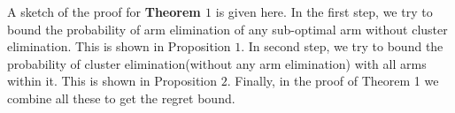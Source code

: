 \begin{remark}
\label{Result:Rem:8}
A sketch of the proof for \textbf{Theorem $1$} is given here. In the first step, we try to bound the probability of arm elimination of any sub-optimal arm without cluster elimination. This is shown in Proposition $1$. In second step, we try to bound the probability of cluster elimination(without any arm elimination) with all arms within it. This is shown in Proposition $2$. Finally, in the proof of Theorem 1 we combine all these to get the regret bound.  
\end{remark}
	




